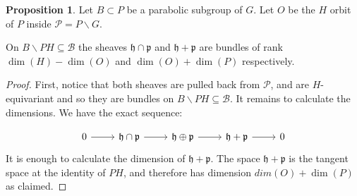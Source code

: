 \documentclass[12pt]{article}
\newcommand{\B}{\mathcal{B}}
\theoremstyle{plain}
\theoremstyle{definition}
\newtheorem{prop}[theorem]{Proposition}
\begin{document}
\begin{prop}\label{dimnesion calculation}
    Let $B\subset P$ be a parabolic subgroup of $G$.
     Let $O$ be the $H$ orbit of $P$ inside $\mathcal{P} =P\backslash G$.

     
    On $B\backslash PH\subseteq\B$ the sheaves $\mathfrak{h}\cap \mathfrak{p}$ and $\mathfrak{h} + \mathfrak{p}$ are bundles of rank $\dim(H) - \dim(O)$ and $\dim(O)+\dim(P)$ respectively.
    
\end{prop}
\begin{proof}
    First, notice that both sheaves are pulled back from $\mathcal{P}$, and are $H$-equivariant and so they are bundles on $B\backslash PH\subseteq\B$.  It remains to calculate the dimensions. We have the exact sequence:

    \[\begin{tikzcd}
	   0 & \mathfrak{h}\cap \mathfrak{p} & \mathfrak{h} \oplus \mathfrak{p} & \mathfrak{h} + \mathfrak{p} & 0
	   \arrow[from=1-1, to=1-2]
	   \arrow[from=1-2, to=1-3]
	   \arrow[from=1-3, to=1-4]
	   \arrow[from=1-4, to=1-5]
    \end{tikzcd}\]
    It is enough to calculate the dimension of $\mathfrak{h} + \mathfrak{p}$. The space $\mathfrak{h} + \mathfrak{p}$ is the tangent space at the identity of $PH$, and therefore has dimension $dim(O)+\dim(P)$ as claimed.
\end{proof}
\end{document}
